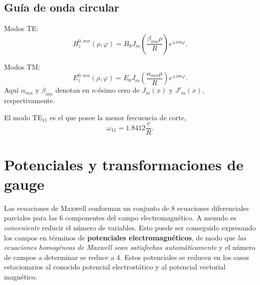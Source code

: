 \subsection{Guía de onda circular}

Modos TE:
\begin{equation}
B_z^{0,mn}(\rho,\varphi)=B_0J_m(\frac{\beta_{mn}\rho}{R})e^{\pm im\varphi}.
\end{equation}

Modos TM:	
\begin{equation}
E_z^{0,mn}(\rho,\varphi)=E_0J_m(\frac{\alpha_{mn}\rho}{R})e^{\pm im\varphi}.
\end{equation}
Aquí $\alpha_{mn}$ y $\beta_{mn}$ denotan en $n$-ésimo cero de $J_m(x)$ y $J'_m(x)$, respectivamente.

El modo TE$_{11}$ es el que posee la menor frecuencia de corte,
\begin{equation}
\omega_{11}=1.8412\frac{c}{R}.
\end{equation}


\section{Potenciales y transformaciones de gauge}

Las ecuaciones de Maxwell conforman un conjunto de 8 ecuaciones diferenciales
parciales para las 6 componentes del campo electromagnético. A menudo es
\textit{conveniente} reducir el número de variables. Esto puede ser conseguido
expresando los campos en términos de \textbf{potenciales electromagnéticos},
de modo que \textit{las ecuaciones homogéneas de Maxwell sean satisfechas
automáticamente} y el número de campos a determinar se reduce a 4. Estos
potenciales se reducen en los casos estacionarios al conocido potencial
electrostático y al potencial vectorial magnético.

